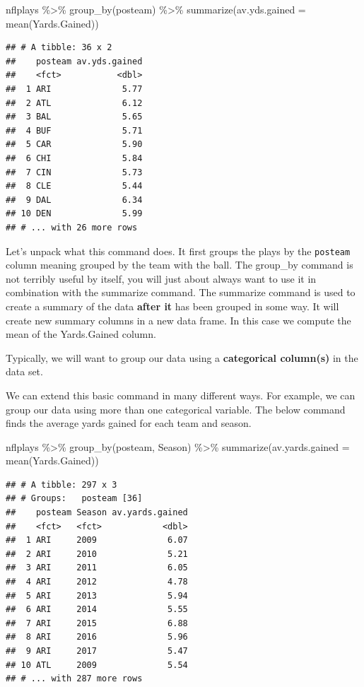 \documentclass[
]{book}
\newenvironment{Shaded}{\begin{snugshade}}{\end{snugshade}}
\newcommand{\AttributeTok}[1]{\textcolor[rgb]{0.77,0.63,0.00}{#1}}
\newcommand{\FunctionTok}[1]{\textcolor[rgb]{0.00,0.00,0.00}{#1}}
\newcommand{\NormalTok}[1]{#1}
\newcommand{\SpecialCharTok}[1]{\textcolor[rgb]{0.00,0.00,0.00}{#1}}
\theoremstyle{definition}
\theoremstyle{definition}
\theoremstyle{definition}
\theoremstyle{definition}
\theoremstyle{remark}
\begin{document}
\begin{Shaded}
\begin{Highlighting}[]
\NormalTok{nflplays }\SpecialCharTok{\%\textgreater{}\%}
    \FunctionTok{group\_by}\NormalTok{(posteam) }\SpecialCharTok{\%\textgreater{}\%}
    \FunctionTok{summarize}\NormalTok{(}\AttributeTok{av.yds.gained =} \FunctionTok{mean}\NormalTok{(Yards.Gained))}
\end{Highlighting}
\end{Shaded}

\begin{verbatim}
## # A tibble: 36 x 2
##    posteam av.yds.gained
##    <fct>           <dbl>
##  1 ARI              5.77
##  2 ATL              6.12
##  3 BAL              5.65
##  4 BUF              5.71
##  5 CAR              5.90
##  6 CHI              5.84
##  7 CIN              5.73
##  8 CLE              5.44
##  9 DAL              6.34
## 10 DEN              5.99
## # ... with 26 more rows
\end{verbatim}

Let's unpack what this command does. It first groups the plays by the \texttt{posteam} column meaning grouped by the team with the ball. The group\_by command is not terribly useful by itself, you will just about always want to use it in combination with the summarize command. The summarize command is used to create a summary of the data \textbf{after it} has been grouped in some way. It will create new summary columns in a new data frame. In this case we compute the mean of the Yards.Gained column.

Typically, we will want to group our data using a \textbf{categorical column(s)} in the data set.

We can extend this basic command in many different ways. For example, we can group our data using more than one categorical variable. The below command finds the average yards gained for each team and season.

\begin{Shaded}
\begin{Highlighting}[]
\NormalTok{nflplays }\SpecialCharTok{\%\textgreater{}\%}
    \FunctionTok{group\_by}\NormalTok{(posteam, Season) }\SpecialCharTok{\%\textgreater{}\%}
    \FunctionTok{summarize}\NormalTok{(}\AttributeTok{av.yards.gained =} \FunctionTok{mean}\NormalTok{(Yards.Gained))}
\end{Highlighting}
\end{Shaded}

\begin{verbatim}
## # A tibble: 297 x 3
## # Groups:   posteam [36]
##    posteam Season av.yards.gained
##    <fct>   <fct>            <dbl>
##  1 ARI     2009              6.07
##  2 ARI     2010              5.21
##  3 ARI     2011              6.05
##  4 ARI     2012              4.78
##  5 ARI     2013              5.94
##  6 ARI     2014              5.55
##  7 ARI     2015              6.88
##  8 ARI     2016              5.96
##  9 ARI     2017              5.47
## 10 ATL     2009              5.54
## # ... with 287 more rows
\end{verbatim}
\end{document}
